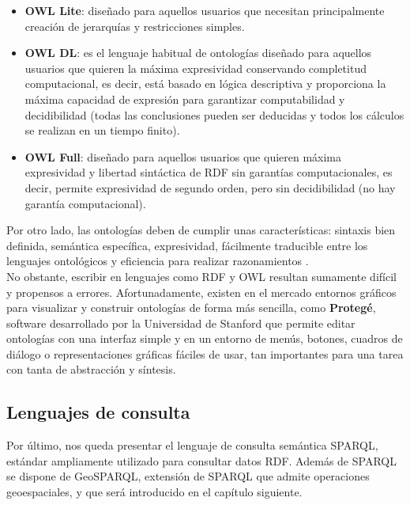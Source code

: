 \begin{itemize}
	\item \textbf{OWL Lite}: diseñado para aquellos usuarios que necesitan principalmente creación de jerarquías y restricciones simples.
	
	\item \textbf{OWL DL}: es el lenguaje habitual de ontologías diseñado para aquellos usuarios que quieren la máxima expresividad conservando completitud computacional, es decir, está basado en lógica descriptiva y proporciona la máxima capacidad de expresión para garantizar computabilidad y decidibilidad (todas las conclusiones pueden ser deducidas y todos los cálculos se realizan en un tiempo finito).
	
	\item \textbf{OWL Full}: diseñado para aquellos usuarios que quieren máxima expresividad y libertad sintáctica de RDF sin garantías computacionales, es decir, permite expresividad de segundo orden, pero sin decidibilidad (no hay garantía computacional).
\end{itemize}



Por otro lado, las ontologías deben de cumplir unas características: sintaxis bien definida, semántica específica, expresividad, fácilmente traducible entre los lenguajes ontológicos y eficiencia para realizar razonamientos \cite{apuntes-clase-jose}.\\

No obstante, escribir en lenguajes como RDF y OWL resultan sumamente difícil y propensos a errores. Afortunadamente, existen en el mercado entornos gráficos para visualizar y construir ontologías de forma más sencilla, como \textbf{Protegé}, software desarrollado por la Universidad de Stanford que permite editar ontologías con una interfaz simple y en un entorno de menús, botones, cuadros de diálogo o representaciones gráficas fáciles de usar, tan importantes para una tarea con tanta de abstracción y síntesis.

\subsection{Lenguajes de consulta}


Por último, nos queda presentar el lenguaje de consulta semántica SPARQL, estándar ampliamente utilizado para consultar datos RDF. Además de SPARQL se dispone de GeoSPARQL, extensión de SPARQL que admite operaciones geoespaciales, y que será introducido en el capítulo siguiente.


